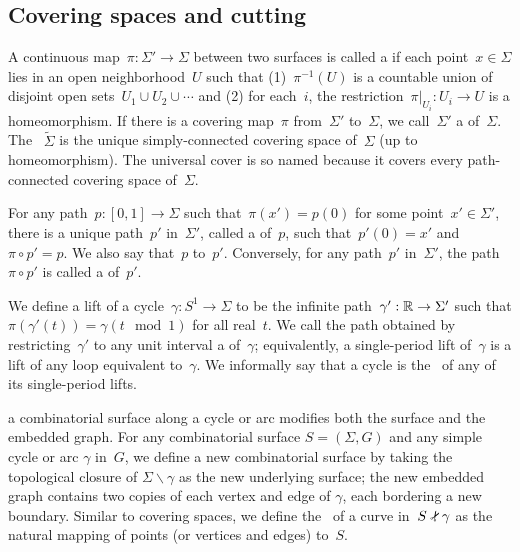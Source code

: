 \documentclass[11pt,twoside]{article}
\def\snip{\mathbin{\raisebox{0.15ex}{\rotatebox[origin=c]{60}{\Rightscissors}\!}}}
\def\snip{\mathbin{\raisebox{0.15ex}{\rotatebox[origin=c]{60}{\Rightscissors}\!}}}
\begin{document}
\subsection{Covering spaces and cutting}
\label{SS:covering}

A continuous map~$\pi : \Sigma' \to \Sigma$ between two surfaces is called a
 if each point~$x \in \Sigma$ lies in an open
neighborhood~$U$ such that (1)~$\pi^{-1}(U)$ is a countable union of disjoint
open sets~$U_1 \cup U_2 \cup \cdots$ and (2) for each~$i$, the
restriction~$\pi |_{U_i} : U_i \to U$ is a homeomorphism. If there is a covering
map~$\pi$ from~$\Sigma'$ to~$\Sigma$, we call~$\Sigma'$ a 
of~$\Sigma$. The ~$\tilde{\Sigma}$ is the unique
simply-connected covering space of~$\Sigma$ (up to homeomorphism).
The universal cover is so named because it covers every path-connected
covering space of~$\Sigma$.

For any path~$p : [0,1] \to \Sigma$ such that~$\pi(x') = p(0)$ for some
point~$x' \in \Sigma'$, there is a unique path~$p'$ in~$\Sigma'$, called
a  of~$p$, such that~$p'(0) = x'$ and~$\pi \circ p' = p$. We also
say that~$p$  to~$p'$. Conversely, for any path~$p'$ in~$\Sigma'$,
the path~$\pi \circ p'$ is called a  of~$p'$.

We define a lift of a cycle~$\gamma : S^1 \to \Sigma$ to be the infinite
path~$\gamma' : \R \to \Sigma'$ such that
${\pi(\gamma'(t)) = \gamma(t \mod 1)}$
for all real~$t$. We call the path obtained by restricting~$\gamma'$ to any
unit interval a  of~$\gamma$; equivalently, a
single-period lift of~$\gamma$ is a lift of any loop equivalent to~$\gamma$.
We informally say that a cycle is the~ of any of its
single-period lifts.

 a combinatorial surface along a cycle or  arc modifies both the surface and the embedded graph.
For any combinatorial surface $S = (\Sigma, G)$ and any simple cycle or arc $\gamma$ in~$G$, we define a new combinatorial surface \EMPH{$S \snip \gamma$} by taking the topological closure of $\Sigma \backslash \gamma$ as the new underlying surface; the new embedded graph contains two copies of each vertex and edge of $\gamma$, each bordering a new boundary.
Similar to covering spaces, we define the~ of a curve in~$S \snip \gamma$ as the natural mapping of points (or vertices and edges) to~$S$.


\end{document}

